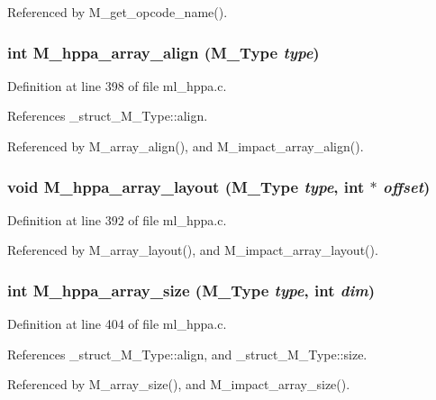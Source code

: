 Referenced by M\_\-get\_\-opcode\_\-name().
\subsubsection{\setlength{\rightskip}{0pt plus 5cm}int M\_\-hppa\_\-array\_\-align (\bf{M\_\-Type} {\em type})}\label{m__hppa_8h_ec186a71c49e8fc22e414e5c070966f2}




Definition at line 398 of file ml\_\-hppa.c.

References \_\-struct\_\-M\_\-Type::align.

Referenced by M\_\-array\_\-align(), and M\_\-impact\_\-array\_\-align().
\subsubsection{\setlength{\rightskip}{0pt plus 5cm}void M\_\-hppa\_\-array\_\-layout (\bf{M\_\-Type} {\em type}, int $\ast$ {\em offset})}\label{m__hppa_8h_c435729f60c6697c5464f5ec86173032}




Definition at line 392 of file ml\_\-hppa.c.

Referenced by M\_\-array\_\-layout(), and M\_\-impact\_\-array\_\-layout().
\subsubsection{\setlength{\rightskip}{0pt plus 5cm}int M\_\-hppa\_\-array\_\-size (\bf{M\_\-Type} {\em type}, int {\em dim})}\label{m__hppa_8h_7a5dd1ad548213f4facd4c5d78bec232}




Definition at line 404 of file ml\_\-hppa.c.

References \_\-struct\_\-M\_\-Type::align, and \_\-struct\_\-M\_\-Type::size.

Referenced by M\_\-array\_\-size(), and M\_\-impact\_\-array\_\-size().
